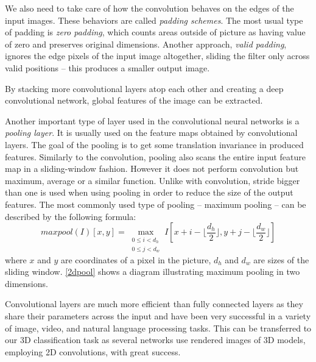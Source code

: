 

We also need to take care of how the convolution behaves on the edges of the input images. These behaviors are called \textit{padding schemes}. The most usual type of padding is \textit{zero padding}, which counts areas outside of picture as having value of zero and preserves original dimensions. Another approach, \textit{valid padding}, ignores the edge pixels of the input image altogether, sliding the filter only across valid positions -- this produces a smaller output image. \par
By stacking more convolutional layers atop each other and creating a deep convolutional network,  global features of the image can be extracted. 
\par
Another important type of layer used in the convolutional neural networks is a \textit{pooling layer}. It is usually used on the feature maps obtained by convolutional layers. The goal of the pooling is to get some translation invariance in produced features. Similarly to the convolution, pooling also scans the entire input feature map in a sliding-window fashion. However it does not perform convolution but maximum, average or a similar function. Unlike with convolution, stride bigger than one is used when using pooling in order to reduce the size of the output features.
The most commonly used type of pooling -- maximum pooling -- can be described by the following formula: 
$$maxpool(I)[x,y] =
\max_{\substack{0 \leq i < d_h\\
		0 \leq j < d_w}}
I[x + i - \lfloor \frac{d_h}{2} \rfloor, y + j - \lfloor \frac{d_w}{2}  \rfloor ] $$ where $x$ and $y$ are coordinates of a pixel in the picture, $d_h$ and $d_w$ are sizes of the sliding window. \autoref{2dpool} shows a diagram illustrating maximum pooling in two dimensions.\par
Convolutional layers are much more efficient than fully connected layers as they share their parameters across the input and have been very successful in a variety of image, video, and natural language processing tasks. This  can be transferred to our 3D classification task as several networks use rendered images of 3D models, employing 2D convolutions, with great success. 




